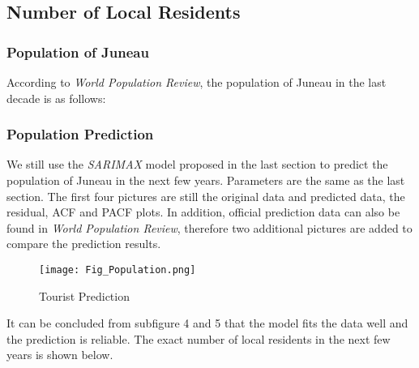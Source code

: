 \subsection{Number of Local Residents}

\subsubsection{Population of Juneau}

According to \textit{World Population Review}, the population of Juneau in the last decade is as follows:

\begin{table}[H]
    \centering
    \caption{Population of Juneau}
    \renewcommand{\arraystretch}{1.3}
\end{table}

\subsubsection{Population Prediction}

We still use the \textit{SARIMAX} model proposed in the last section
to predict the population of Juneau in the next few years. Parameters are the same as the last section.
The first four pictures are still the original data and predicted data, the residual, ACF and PACF plots.
In addition, official prediction data can also be found in \textit{World Population Review}, therefore two additional pictures are added to compare the prediction results.

\begin{figure}[H]
    \centering
    \texttt{[image: Fig\_Population.png]} %
    \vspace{-0.4cm}
    \caption{Tourist Prediction}
\end{figure}

It can be concluded from subfigure 4 and 5 that the model fits the data well 
and the prediction is reliable. The exact number of local residents in the next 
few years is shown below.


